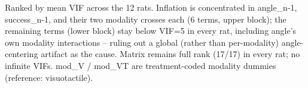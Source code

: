\begin{table}[htbp]
\begin{tabular}{lccccc}
\bottomrule
\end{tabular}
\vspace{4pt}
\par\noindent
\begin{minipage}{\linewidth}\small Ranked by mean VIF across the 12 rats. Inflation is concentrated in angle\_n-1, success\_n-1, and their two modality crosses each (6 terms, upper block); the remaining terms (lower block) stay below VIF=5 in every rat, including angle's own modality interactions -- ruling out a global (rather than per-modality) angle-centering artifact as the cause. Matrix remains full rank (17/17) in every rat; no infinite VIFs. mod\_V / mod\_VT are treatment-coded modality dummies (reference: visuotactile).\end{minipage}
\end{table}
